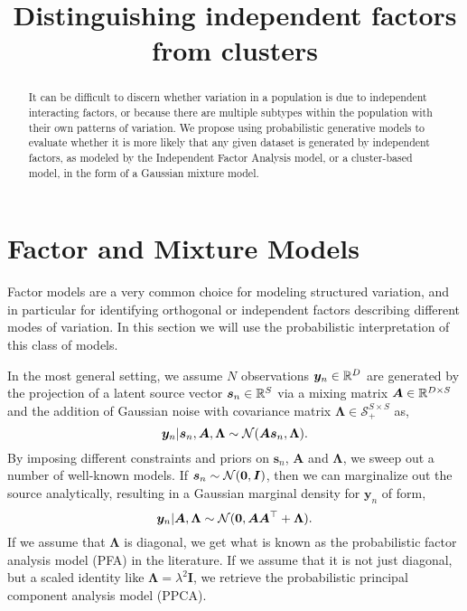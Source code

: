 \documentclass{article}
\title{Distinguishing independent factors from clusters}
\newcommand{\mix}{\bm{A}}
\newcommand{\source}{s}
\newcommand{\sourcevec}{\bm{\source}}
\newcommand{\obs}{y}
\newcommand{\obsvec}{\bm{\obs}}
\newcommand{\noisecov}{\bm{\Lambda}}
\newcommand{\noisescalesq}{\lambda^2}
\newcommand{\numobs}{N}
\newcommand{\numfactor}{S}
\newcommand{\obsdim}{D}
\begin{document}
\maketitle

\begin{abstract}
It can be difficult to discern whether variation in a population is due to independent interacting factors, or because there are multiple subtypes within the population with their own patterns of variation. 
We propose using probabilistic generative models to evaluate whether it is more likely that any given dataset is generated by independent factors, as modeled by the Independent Factor Analysis model, or a cluster-based model, in the form of a Gaussian mixture model.  
\end{abstract}

\section{Factor and Mixture Models}
Factor models are a very common choice for modeling structured variation, and in particular for identifying orthogonal or independent factors describing different modes of variation. In this section we will use the probabilistic interpretation of this class of models.

In the most general setting, we assume $\numobs$ observations $\obsvec_n\in \reals^\obsdim$ are generated by the projection of a latent source vector $\sourcevec_n\in \reals^\numfactor$ via a mixing matrix $\mix \in \reals^{\obsdim\times\numfactor}$ and the addition of Gaussian noise with covariance matrix $\noisecov\in\mathcal{S}_+^{\numfactor\times\numfactor}$ as,
\begin{equation}
\label{eq:likelihood}
\obsvec_n\cond\sourcevec_n,\mix,\noisecov\sim  \gaussrnd(\mix\sourcevec_n,\noisecov).
\end{equation}
By imposing different constraints and priors on $\sourcevec_n$, $\mix$ and $\noisecov$, we sweep out a number of well-known models. If $\sourcevec_n\sim\gaussrnd(\bm{0},\bm{I})$, then we can marginalize out the source analytically, resulting in a Gaussian marginal density for $\obsvec_n$ of form,
\begin{equation}
\label{eq:factormodel}
\obsvec_n\cond \mix, \noisecov\sim \gaussrnd(\bm{0},\mix\mix\T+\noisecov).
\end{equation}
If we assume that $\noisecov$ is diagonal, we get what is known as the probabilistic factor analysis model (PFA) in the literature. If we assume that it is not just diagonal, but a scaled identity like $\noisecov=\noisescalesq\bm{I}$, we retrieve the probabilistic principal component analysis model (PPCA).
\end{document}
